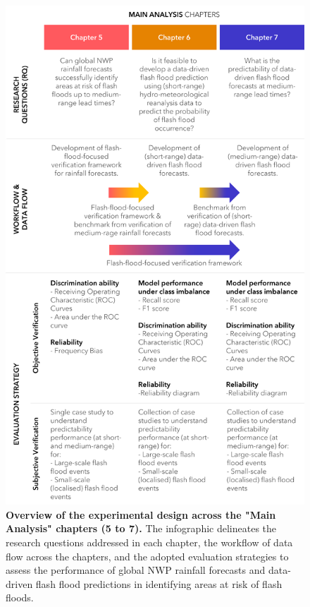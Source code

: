 \begin{figure}[htbp]
\centering
\includegraphics[scale=0.95]{Figures/Chapter_04/workflow_dataflow.png}
\caption{\textbf{Overview of the experimental design across the "Main Analysis" chapters (5 to 7).} The infographic delineates the research questions addressed in each chapter, the workflow of data flow across the chapters, and the adopted evaluation strategies to assess the performance of global NWP rainfall forecasts and data-driven flash flood predictions in identifying areas at risk of flash floods.}
\label{fig:workflow_dataflow}
\end{figure}

